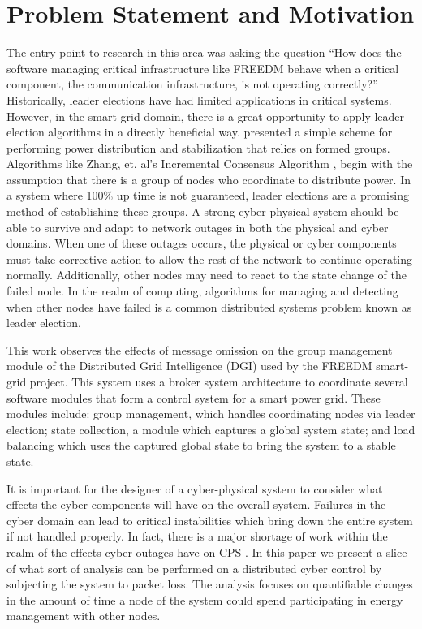 \chapter{Problem Statement and Motivation}

The entry point to research in this area was asking the question ``How does the software managing critical infrastructure like FREEDM behave when a critical component, the communication infrastructure, is not operating correctly?'' 
Historically, leader elections have had limited applications in critical systems. However, in the smart grid domain, there is a great opportunity to apply leader election algorithms in a directly beneficial way. \cite{LOADBALANCING} presented a simple scheme for performing power distribution and stabilization that relies on formed groups. Algorithms like Zhang, et. al's Incremental Consensus Algorithm \cite{INCREMENTALCONSENSUS}, begin with the assumption that there is a group of nodes who coordinate to distribute power. In a system where 100\% up time is not guaranteed, leader elections are a promising method of establishing these groups.
A strong cyber-physical system should be able to survive and adapt to network outages in both the physical and cyber domains. When one of these outages occurs, the physical or cyber components must take corrective action to allow the rest of the network to continue operating normally. Additionally, other nodes may need to react to the state change of the failed node. In the realm of computing, algorithms for managing and detecting when other nodes have failed is a common distributed systems problem known as leader election.

This work observes the effects of message omission on the group management module of the Distributed Grid Intelligence (DGI) used by the FREEDM smart-grid project. This system uses a broker system architecture to coordinate several software modules that form a control system for a smart power grid. These modules include: group management, which handles coordinating nodes via leader election; state collection, a module which
captures a global system state; and load balancing which uses the captured global state to bring the system to a stable state.

It is important for the designer of a cyber-physical system to consider what effects the cyber components will have on the overall system. Failures in the cyber domain can lead to critical instabilities which bring down the entire system if not handled properly.  In fact, there is a major shortage of work within the realm of the effects cyber outages have on \ac{CPS} \cite{CYBERRESEARCHCALL} \cite{SMARTGRIDBENEFITS}.
In this paper we present a slice of what sort of analysis can be performed on a distributed cyber control by subjecting the system to packet loss. The analysis focuses on quantifiable changes in the amount of time a node of the system could spend participating in energy management with other nodes.

